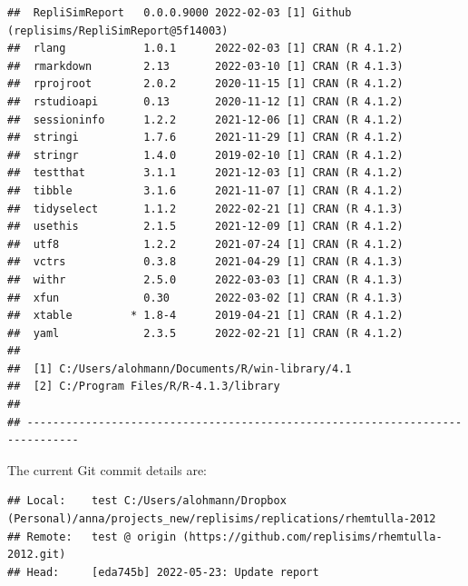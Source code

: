 \documentclass[10,a4paperpaper,]{article}
\begin{document}
\begin{verbatim}
##  RepliSimReport   0.0.0.9000 2022-02-03 [1] Github (replisims/RepliSimReport@5f14003)
##  rlang            1.0.1      2022-02-03 [1] CRAN (R 4.1.2)
##  rmarkdown        2.13       2022-03-10 [1] CRAN (R 4.1.3)
##  rprojroot        2.0.2      2020-11-15 [1] CRAN (R 4.1.2)
##  rstudioapi       0.13       2020-11-12 [1] CRAN (R 4.1.2)
##  sessioninfo      1.2.2      2021-12-06 [1] CRAN (R 4.1.2)
##  stringi          1.7.6      2021-11-29 [1] CRAN (R 4.1.2)
##  stringr          1.4.0      2019-02-10 [1] CRAN (R 4.1.2)
##  testthat         3.1.1      2021-12-03 [1] CRAN (R 4.1.2)
##  tibble           3.1.6      2021-11-07 [1] CRAN (R 4.1.2)
##  tidyselect       1.1.2      2022-02-21 [1] CRAN (R 4.1.3)
##  usethis          2.1.5      2021-12-09 [1] CRAN (R 4.1.2)
##  utf8             1.2.2      2021-07-24 [1] CRAN (R 4.1.2)
##  vctrs            0.3.8      2021-04-29 [1] CRAN (R 4.1.3)
##  withr            2.5.0      2022-03-03 [1] CRAN (R 4.1.3)
##  xfun             0.30       2022-03-02 [1] CRAN (R 4.1.3)
##  xtable         * 1.8-4      2019-04-21 [1] CRAN (R 4.1.2)
##  yaml             2.3.5      2022-02-21 [1] CRAN (R 4.1.2)
## 
##  [1] C:/Users/alohmann/Documents/R/win-library/4.1
##  [2] C:/Program Files/R/R-4.1.3/library
## 
## ------------------------------------------------------------------------------
\end{verbatim}

The current Git commit details are:

\begin{verbatim}
## Local:    test C:/Users/alohmann/Dropbox (Personal)/anna/projects_new/replisims/replications/rhemtulla-2012
## Remote:   test @ origin (https://github.com/replisims/rhemtulla-2012.git)
## Head:     [eda745b] 2022-05-23: Update report
\end{verbatim}
\end{document}
